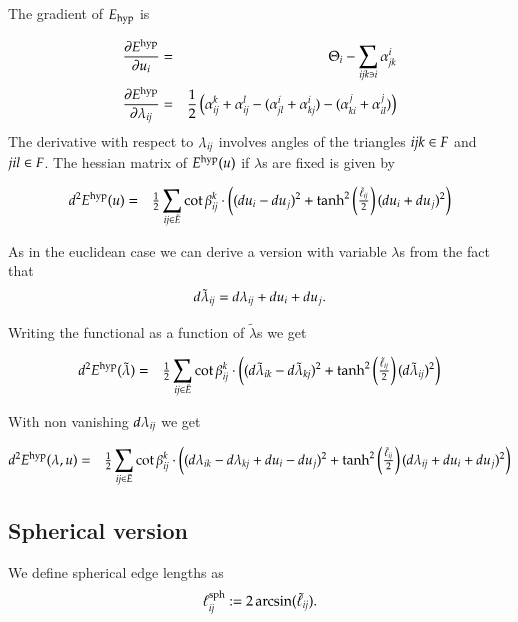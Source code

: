 \documentclass[Thesis]{subfiles}
\begin{document}
The gradient of $E_{\rm hyp}$ is

\begin{eqnarray}
	\frac{\partial E^{\rm hyp}}{\partial u_i} &=& \Theta_i - \sum_{\it ijk\ni i}\alpha^i_{\it jk} \\
	\frac{\partial E^{\rm hyp}}{\partial \lambda_{\it ij}} &=& 
	\frac{1}{2}\left(\alpha_{\it ij}^k + \alpha_{\it ij}^l - (\alpha^i_{\it jl} + \alpha^i_{\it kj}) - (\alpha^j_{\it ki} + \alpha^j_{\it il})\right)
\end{eqnarray}
The derivative with respect to $\lambda_{\it ij}$ involves angles of the triangles $\it ijk\in F$ and $\it jil\in F$.
The hessian matrix of $E^{\rm hyp}(u)$ if $\lambda$s are fixed is given by

\begin{eqnarray*}
d^2E^{\rm hyp}(u)
&=&\tfrac{1}{2}\sum_{\it ij\in \bar E} \cot\beta^k_{\it ij} \cdot \left((du_i-du_j)^2+
\tanh^2\left(\tfrac{\tilde \ell_{\it ij}}{2}\right)(du_i+du_j)^2\right)
\end{eqnarray*}
 
As in the euclidean case we can derive a version with variable $\lambda$s from the fact that 
\begin{equation*}
d\tilde \lambda_{\it ij}=d\lambda_{\it ij}+du_i+du_j.
\end{equation*}

Writing the functional as a function of $\tilde \lambda$s we get 

\begin{eqnarray*}
 d^2E^{\rm hyp}(\tilde \lambda) &=&
 \tfrac{1}{2}\sum_{\it ij\in \bar{E}} \cot\beta^k_{\it ij} \cdot \left((d\tilde\lambda_{\it ik}-d\tilde\lambda_{\it kj})^2+\tanh^2\left(\tfrac{\tilde \ell_{\it ij}}{2}\right)(d\tilde\lambda_{\it ij})^2\right)
\end{eqnarray*}

With non vanishing $d\lambda_{\it ij}$ we get
  
\begin{eqnarray*}
d^2E^{\rm hyp}(\lambda, u)
&=& \tfrac{1}{2}\sum_{\it ij\in \bar{E}} \cot\beta^k_{\it ij} \cdot 
 \left((d\lambda_{\it ik}-d\lambda_{\it kj} +  du_i-du_j)^2+\tanh^2\left(\tfrac{\tilde \ell_{\it ij}}{2}\right)(d\lambda_{\it ij} +du_i+du_j)^2\right)
\end{eqnarray*}

\subsection{Spherical version}
We define spherical edge lengths as 
\begin{equation}
\ell^{\rm sph}_{\it ij} := 2\arcsin(\tilde \ell_{\it ij}).\label{eq:spherical_lengths}
\end{equation}
\end{document}
